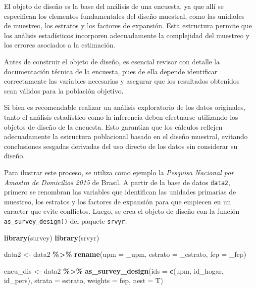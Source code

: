 \documentclass[
  spanish,
  12pt,
]{book}
\newenvironment{Shaded}{\begin{snugshade}}{\end{snugshade}}
\newcommand{\AttributeTok}[1]{\textcolor[rgb]{0.13,0.29,0.53}{#1}}
\newcommand{\FunctionTok}[1]{\textcolor[rgb]{0.13,0.29,0.53}{\textbf{#1}}}
\newcommand{\NormalTok}[1]{#1}
\newcommand{\OtherTok}[1]{\textcolor[rgb]{0.56,0.35,0.01}{#1}}
\newcommand{\SpecialCharTok}[1]{\textcolor[rgb]{0.81,0.36,0.00}{\textbf{#1}}}
\newcommand{\StringTok}[1]{\textcolor[rgb]{0.31,0.60,0.02}{#1}}
\begin{document}
El objeto de diseño es la base del análisis de una encuesta, ya que allí se especifican los elementos fundamentales del diseño muestral, como las unidades de muestreo, los estratos y los factores de expansión. Esta estructura permite que los análisis estadísticos incorporen adecuadamente la complejidad del muestreo y los errores asociados a la estimación.

Antes de construir el objeto de diseño, es esencial revisar con detalle la documentación técnica de la encuesta, pues de ella depende identificar correctamente las variables necesarias y asegurar que los resultados obtenidos sean válidos para la población objetivo.

Si bien es recomendable realizar un análisis exploratorio de los datos originales, tanto el análisis estadístico como la inferencia deben efectuarse utilizando los objetos de diseño de la encuesta. Esto garantiza que los cálculos reflejen adecuadamente la estructura poblacional basado en el diseño muestral, evitando conclusiones sesgadas derivadas del uso directo de los datos sin considerar su diseño.

Para ilustrar este proceso, se utiliza como ejemplo la \emph{Pesquisa Nacional por Amostra de Domicílios 2015} de Brasil. A partir de la base de datos \texttt{data2}, primero se renombran las variables que identifican las unidades primarias de muestreo, los estratos y los factores de expansión para que empiecen en un caracter que evite conflictos. Luego, se crea el objeto de diseño con la función \texttt{as\_survey\_design()} del paquete \texttt{srvyr}:

\begin{Shaded}
\begin{Highlighting}[]
\FunctionTok{library}\NormalTok{(survey)}
\FunctionTok{library}\NormalTok{(srvyr)}

\NormalTok{data2 }\OtherTok{\textless{}{-}}\NormalTok{ data2 }\SpecialCharTok{\%\textgreater{}\%} 
  \FunctionTok{rename}\NormalTok{(}\AttributeTok{upm =} \StringTok{\textasciigrave{}}\AttributeTok{\_upm}\StringTok{\textasciigrave{}}\NormalTok{, }\AttributeTok{estrato =} \StringTok{\textasciigrave{}}\AttributeTok{\_estrato}\StringTok{\textasciigrave{}}\NormalTok{, }\AttributeTok{fep =} \StringTok{\textasciigrave{}}\AttributeTok{\_fep}\StringTok{\textasciigrave{}}\NormalTok{) }

\NormalTok{encu\_dis }\OtherTok{\textless{}{-}}\NormalTok{ data2 }\SpecialCharTok{\%\textgreater{}\%} 
             \FunctionTok{as\_survey\_design}\NormalTok{(}\AttributeTok{ids =} \FunctionTok{c}\NormalTok{(upm, id\_hogar, id\_pers),}
                              \AttributeTok{strata =}\NormalTok{ estrato,}
                              \AttributeTok{weights =}\NormalTok{ fep,}
                              \AttributeTok{nest =}\NormalTok{ T)}
\end{Highlighting}
\end{Shaded}
\end{document}
